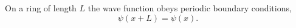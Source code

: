 \documentclass{article}
\begin{document}
On a ring of length $L$ the wave function obeys periodic boundary conditions,
\begin{equation}
\psi(x+L) = \psi(x) .
\label{eq:pbc}
\end{equation}
\end{document}
